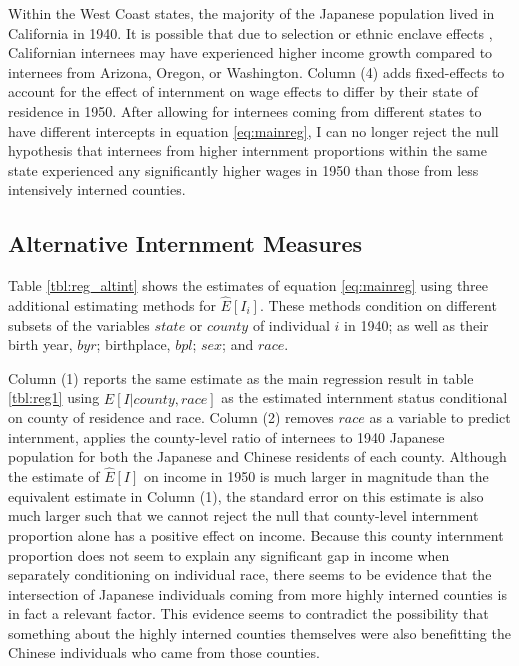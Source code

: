 Within the West Coast states, 
the majority of the Japanese population lived in California in 1940.
It is possible that due to selection or ethnic enclave effects 
\citep{edinEthnicEnclavesEconomic2003},
Californian internees may have experienced higher income growth
compared to internees from Arizona, Oregon, or Washington.
Column (4) adds fixed-effects to account for the effect of internment on wage effects to
differ by their state of residence in 1950.
After allowing for internees coming from different states
to have different intercepts in equation \ref{eq:mainreg},
I can no longer reject the null hypothesis that 
internees from higher internment proportions within the same state
experienced any significantly higher wages in 1950 
than those from less intensively interned counties.

\subsection{Alternative Internment Measures}\label{sec:altint}

Table \ref{tbl:reg_altint} shows the estimates of equation \ref{eq:mainreg}
using three additional estimating methods for $\hat{E}[I_i]$.
These methods condition on different subsets of the variables
$state$ or $county$ of individual $i$ in 1940;
as well as their birth year, $byr$; birthplace, $bpl$; $sex$; and $race$.



Column (1) reports the same estimate as the main regression result
in table \ref{tbl:reg1} using $\hat{E}[I|county, race]$
as the estimated internment status conditional on county of residence and race.
Column (2) removes $race$ as a variable to predict internment,
applies the county-level ratio of internees to 1940 Japanese population
for both the Japanese and Chinese residents of each county.
Although the estimate of $\hat{E}[I]$ on income in 1950 
is much larger in magnitude than the equivalent estimate in Column (1),
the standard error on this estimate is also much larger
such that we cannot reject the null that county-level internment proportion alone
has a positive effect on income.
Because this county internment proportion
does not seem to explain any significant gap in income
when separately conditioning on individual race,
there seems to be evidence that the intersection of Japanese individuals
coming from more highly interned counties is in fact a relevant factor.
This evidence seems to contradict the possibility that something about the
highly interned counties themselves were also benefitting the Chinese individuals
who came from those counties.

